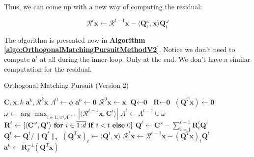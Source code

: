 \documentclass[12pt,a4paper,oneside,english]{UPBThesis}
\newcommand{\hcrange}[2]{\overline{{#1}\colon\!\!{#2}}}
\begin{document}
Thus, we can come up with a new way of computing the residual:

\begin{equation*}
\mathcal{R}^t\textbf{x} \gets \mathcal{R}^{t-1}\textbf{x} - \langle \textbf{Q}_{t}^{\omega}, \textbf{x} \rangle \textbf{Q}_{t}^{\omega}
\end{equation*}

The algorithm is presented now in \textbf{Algorithm \ref{algo:OrthogonalMatchingPursuitMethodV2}}. Notice we don't need to compute $\textbf{a}^t$ at all during the inner-loop. Only at the end. We don't have a similar computation for the residual.

\begin{algorithm}
\caption{Orthogonal Matching Pursuit (Version 2)}
\label{algo:OrthogonalMatchingPursuitMethodV2}
\begin{algorithmic}
\Require $\textbf{C},\textbf{x},k$
\Ensure $\textbf{a}^k,\mathcal{R}^k\textbf{x}$
\State $\Lambda^0 \gets \phi$
\State $\textbf{a}^0 \gets \textbf{0}$
\State $\mathcal{R}^0\textbf{x} \gets \textbf{x}$
\State $\textbf{Q} \gets \textbf{0}$
\State $\textbf{R} \gets \textbf{0}$
\State $(\textbf{Q}^T\textbf{x}) \gets \textbf{0}$
\For {$t = \hcrange{1}{k}$}
\State $\omega \gets \arg \max_{i \in \hcrange{1}{w} \setminus \Lambda^{t-1}} \left| \langle \mathcal{R}^{t-1}\textbf{x} , \textbf{C}^i \rangle \right|$
\State $\Lambda^t \gets \Lambda^{t-1} \cup \omega$
\State $\textbf{R}^t \gets [ \langle \textbf{C}^\omega, \textbf{Q}^i \rangle~\mbox{\textbf{for} $i \in \hcrange{1}{d}$ \textbf{if} $i < t$ \textbf{else} $0$} ]$ 
\State $\textbf{Q}^t \gets \textbf{C}^\omega - \sum_{i=1}^{t-1}\textbf{R}^t_i \textbf{Q}^i$ 
\State $\textbf{Q}^t \gets \textbf{Q}^t / \| \textbf{Q}^t \|_2$ 
\State $(\textbf{Q}^T\textbf{x})_t \gets \langle \textbf{Q}^t, \textbf{x} \rangle$
\State $\mathcal{R}^t\textbf{x} \gets \mathcal{R}^{t-1}\textbf{x} -  (\textbf{Q}^T\textbf{x})_t \textbf{Q}^t$
\EndFor
\State $\textbf{a}^k \gets \textbf{R}_k^{-1}(\textbf{Q}^T\textbf{x})$
\end{algorithmic}
\end{algorithm}
\end{document}
